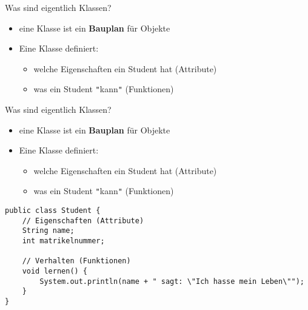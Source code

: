 \documentclass{../../presentation}
\begin{document}
\begin{frame}[fragile,t]{Was sind eigentlich Klassen?}

	\begin{minipage}[t][0.9\textheight][t]{\textwidth}
		\begin{itemize}
			\item eine Klasse ist ein \textbf{Bauplan} für Objekte
			\item<2->Eine Klasse definiert:
			      \begin{itemize}
				      \item[\textbullet] welche Eigenschaften ein Student hat (Attribute)
				      \item[\textbullet] was ein Student \texttt{"}kann\texttt{"} (Funktionen)
			      \end{itemize}
		\end{itemize}

		\vspace{3.5cm}
	\end{minipage}

\end{frame}



\begin{frame}[fragile,t]{Was sind eigentlich Klassen?}

	\begin{minipage}[t][0.9\textheight][t]{\textwidth}
		\begin{itemize}
			\item eine Klasse ist ein \textbf{Bauplan} für Objekte
			\item Eine Klasse definiert:
			      \begin{itemize}
				      \item[\textbullet] welche Eigenschaften ein Student hat (Attribute)
				      \item[\textbullet] was ein Student \texttt{"}kann\texttt{"} (Funktionen)
			      \end{itemize}
		\end{itemize}

		\begin{verbatim}
public class Student {
    // Eigenschaften (Attribute)
    String name;
    int matrikelnummer;

    // Verhalten (Funktionen)
    void lernen() {
        System.out.println(name + " sagt: \"Ich hasse mein Leben\"");
    }
}
\end{verbatim}
	\end{minipage}
\end{frame}
\end{document}
